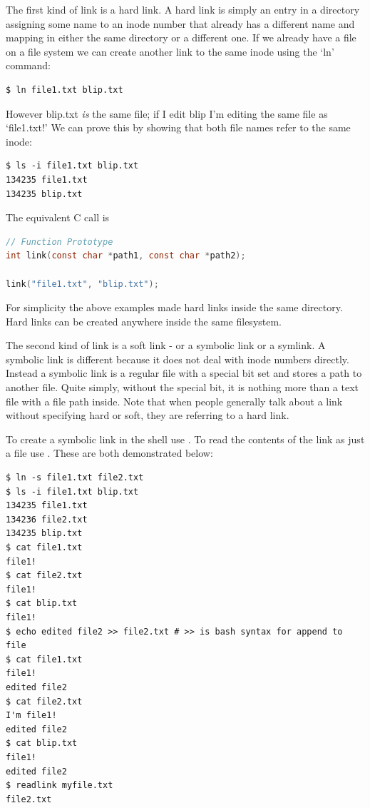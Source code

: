 The first kind of link is a hard link. A hard link is simply an entry in a directory assigning some name to an inode number that already has a different name and mapping in either the same directory or a different one. If we already have a file on a file system we can create another link to the same inode using the `ln' command:

\begin{lstlisting}
$ ln file1.txt blip.txt
\end{lstlisting}

However blip.txt \emph{is} the same file; if I edit blip I'm editing the same file as `file1.txt!' We can prove this by showing that both file names refer to the same inode:

\begin{lstlisting}
$ ls -i file1.txt blip.txt
134235 file1.txt
134235 blip.txt
\end{lstlisting}

The equivalent C call is 

\begin{lstlisting}[language=C]
// Function Prototype
int link(const char *path1, const char *path2);

link("file1.txt", "blip.txt");
\end{lstlisting}

For simplicity the above examples made hard links inside the same directory. Hard links can be created anywhere inside the same filesystem.

The second kind of link is a soft link - or a symbolic link or a symlink. A symbolic link is different because it does not deal with inode numbers directly. Instead a symbolic link is a regular file with a special bit set and stores a path to another file. Quite simply, without the special bit, it is nothing more than a text file with a file path inside. Note that when people generally talk about a link without specifying hard or soft, they are referring to a hard link.

To create a symbolic link in the shell use . To read the contents of the link as just a file use . These are both demonstrated below:

\begin{lstlisting}
$ ln -s file1.txt file2.txt
$ ls -i file1.txt blip.txt
134235 file1.txt
134236 file2.txt
134235 blip.txt
$ cat file1.txt
file1!
$ cat file2.txt
file1!
$ cat blip.txt
file1!
$ echo edited file2 >> file2.txt # >> is bash syntax for append to file
$ cat file1.txt
file1!
edited file2
$ cat file2.txt
I'm file1!
edited file2
$ cat blip.txt
file1!
edited file2
$ readlink myfile.txt
file2.txt
\end{lstlisting}

